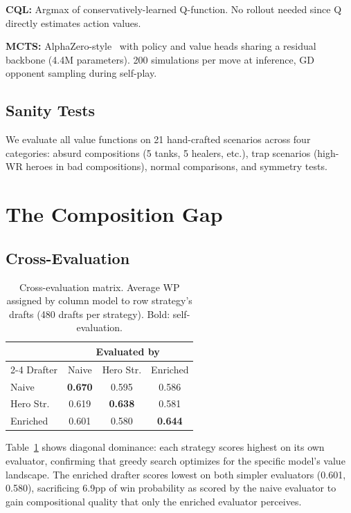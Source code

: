 \documentclass[journal]{IEEEtran}
\begin{document}
\textbf{CQL:} Argmax of conservatively-learned Q-function. No rollout needed since Q directly estimates action values.

\textbf{MCTS:} AlphaZero-style~\cite{silver2016mastering} with policy and value heads sharing a residual backbone (4.4M parameters). 200 simulations per move at inference, GD opponent sampling during self-play.

\subsection{Sanity Tests}

We evaluate all value functions on 21 hand-crafted scenarios across four categories: absurd compositions (5 tanks, 5 healers, etc.), trap scenarios (high-WR heroes in bad compositions), normal comparisons, and symmetry tests.

\section{The Composition Gap}

\subsection{Cross-Evaluation}

\begin{table}[t]
\centering
\caption{Cross-evaluation matrix. Average WP assigned by column model to row strategy's drafts (480 drafts per strategy). Bold: self-evaluation.}
\label{tab:crosseval}
\begin{tabular}{lccc}
\toprule
& \multicolumn{3}{c}{Evaluated by} \\
\cmidrule(lr){2-4}
Drafter & Naive & Hero Str. & Enriched \\
\midrule
Naive & \textbf{0.670} & 0.595 & 0.586 \\
Hero Str. & 0.619 & \textbf{0.638} & 0.581 \\
Enriched & 0.601 & 0.580 & \textbf{0.644} \\
\bottomrule
\end{tabular}
\end{table}

Table~\ref{tab:crosseval} shows diagonal dominance: each strategy scores highest on its own evaluator, confirming that greedy search optimizes for the specific model's value landscape. The enriched drafter scores lowest on both simpler evaluators (0.601, 0.580), sacrificing 6.9pp of win probability as scored by the naive evaluator to gain compositional quality that only the enriched evaluator perceives.
\end{document}
